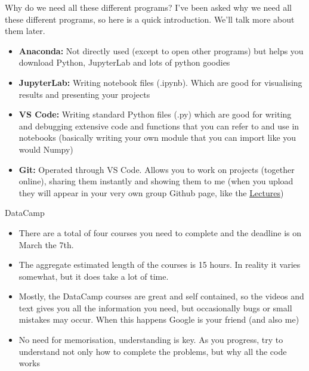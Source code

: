 \documentclass[10pt,danish,t,10pt]{beamer}
\begin{document}
\begin{frame}{Why do we need all these different programs?}
    I've been asked why we need all these different programs, so here is a quick introduction. We'll talk more about them later.
    \begin{itemize}
        \item \textbf{Anaconda:} Not directly used (except to open other programs) but helps you download Python, JupyterLab and lots of python goodies
        \item \textbf{JupyterLab:} Writing notebook files (.ipynb). Which are good for visualising results and presenting your projects
        \item \textbf{VS Code:} Writing standard Python files (.py) which are good for writing  and debugging extensive code and functions that you can refer to and use in notebooks (basically writing your own module that you can import like you would Numpy)
        \item \textbf{Git:} Operated through VS Code. Allows you to work on projects (together online), sharing them instantly and showing them to me (when you upload they will appear in your very own group Github page, like the \href{https://github.com/NumEconCopenhagen/lectures-2021}{\underline{Lectures}})
    \end{itemize}
\end{frame}

\begin{frame}{DataCamp}
    \begin{itemize}
        \item There are a total of four courses you need to complete and the deadline is on March the 7th.
        \item The aggregate estimated length of the courses is 15 hours. In reality it varies somewhat, but it does take a lot of time.
        \item Mostly, the DataCamp courses are great and self contained, so the videos and text gives you all the information you need, but occasionally bugs or small mistakes may occur. When this happens Google is your friend (and also me)
        \item No need for memorisation, understanding is key. As you progress, try to understand not only how to complete the problems, but why all the code works
    \end{itemize}
\end{frame}
\end{document}
